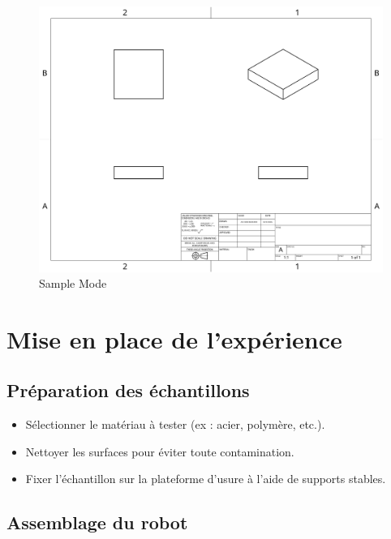 \documentclass[a4paper,12pt]{article}
\begin{document}
\begin{figure}[h]
    \centering
    \includegraphics[width=0.5\linewidth]{Sample.png}
    \caption{Sample Mode}
    \label{fig:sample-mode}
\end{figure}

\section{Mise en place de l'expérience}
\subsection{Préparation des échantillons}
\begin{itemize}
    \item Sélectionner le matériau à tester (ex : acier, polymère, etc.).
    \item Nettoyer les surfaces pour éviter toute contamination.
    \item Fixer l’échantillon sur la plateforme d’usure à l’aide de supports stables.
\end{itemize}

\subsection{Assemblage du robot}
\end{document}
